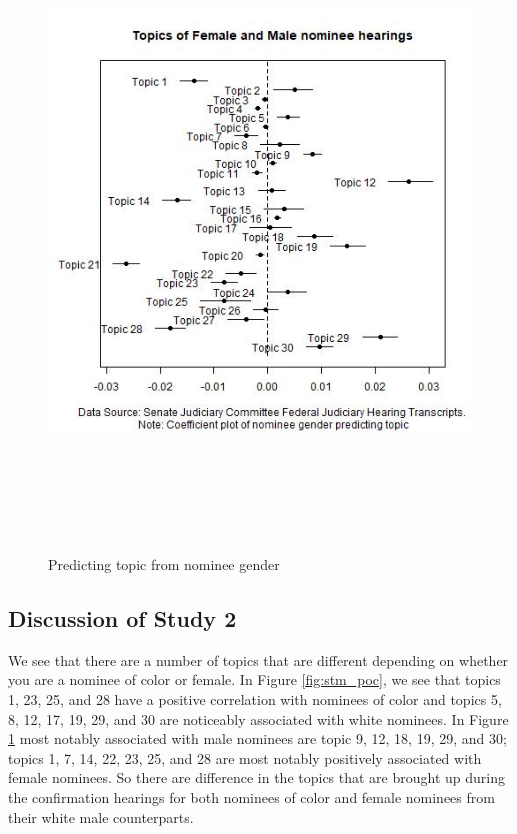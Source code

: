 \documentclass [12pt]{article}
\begin{document}
\begin{figure}[H]
    \centering
    \includegraphics[height = 175mm, width = 175mm]{../tables_figures/stm_male_predict.jpg}
    \caption{Predicting topic from nominee gender}
    \label{fig:stm_male}
\end{figure}

\subsection{Discussion of Study 2}

We see that there are a number of topics that are different depending on whether you are a nominee of color or female. In Figure \ref{fig:stm_poc}, we see that topics 1, 23, 25, and 28 have a positive correlation with nominees of color and topics 5, 8, 12, 17, 19, 29, and 30 are noticeably associated with white nominees. In Figure \ref{fig:stm_male} most notably associated with male nominees are topic 9, 12, 18, 19, 29, and 30; topics 1, 7, 14, 22, 23, 25, and 28 are most notably positively associated with female nominees. So there are difference in the topics that are brought up during the confirmation hearings for both nominees of color and female nominees from their white male counterparts.
\end{document}
